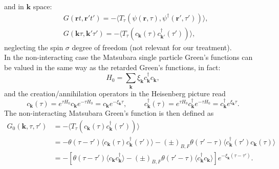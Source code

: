 and in $\mathbf{k}$ space:
\begin{equation}
\begin{split}
    &G(\mathbf{r}t,\mathbf{r}'t')=-\langle T_\tau\left(\psi(\mathbf{r},\tau),\psi^\dagger(\mathbf{r}',\tau')\right)\rangle,\\
    &G(\mathbf{k}\tau,\mathbf{k}'\tau')=-\langle T_\tau\left(c_{\mathbf{k}}(\tau)c^\dagger_{\mathbf{k}'}(\tau')\right)\rangle,
\end{split}
\end{equation}
neglecting the spin $\sigma$ degree of freedom (not relevant for our treatment).\\
In the non-interacting case the Matsubara single particle Green's functions can be valued in the same way as the retarded Green's functions, 
in fact:
\begin{equation}
    H_0=\sum_{\mathbf{k}}\xi_\mathbf{k}c^\dagger_\mathbf{k}c_\mathbf{k},
\end{equation}
and the creation/annihilation operators in the Heisenberg picture read
\begin{equation}
    c_\mathbf{k}(\tau)=e^{\tau H_0}c_\mathbf{k}e^{-\tau H_0}=c_\mathbf{k}e^{-\xi_\mathbf{k}\tau},\hspace{1cm}c^\dagger_\mathbf{k}(\tau)=e^{\tau H_0}c^\dagger_\mathbf{k}e^{-\tau H_0}=c^\dagger_\mathbf{k}e^{\xi_\mathbf{k}\tau}.
\end{equation}
The non-interacting Matsubara Green's function is then defined as 
\begin{equation}
\begin{split}
    G_0(\mathbf{k},\tau,\tau')&=-\langle T_\tau\left(c_\mathbf{k}(\tau)c^\dagger_\mathbf{k}(\tau')\right)\rangle\\
    &=-\theta(\tau-\tau')\langle c_\mathbf{k}(\tau)c^\dagger_\mathbf{k}(\tau')\rangle-(\pm)_{B,F}\theta(\tau'-\tau)\langle c^\dagger_\mathbf{k}(\tau')c_\mathbf{k}(\tau)\rangle\\
    &=-\left[\theta(\tau-\tau')\langle c_\mathbf{k}c^\dagger_\mathbf{k}\rangle-(\pm)_{B,F}\theta(\tau'-\tau)\langle c_\mathbf{k}^\dagger c_\mathbf{k}\rangle\right]e^{-\xi_\mathbf{k}(\tau-\tau')}.
    \label{free_propagator}
\end{split}
\end{equation}
